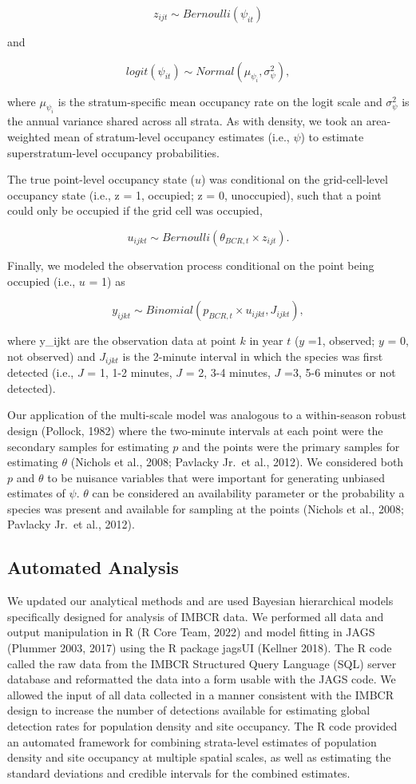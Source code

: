 \documentclass[
  letterpaper,
  DIV=11,
  numbers=noendperiod,
  oneside]{scrreprt}
\begin{document}
\[z_{ijt}\sim Bernoulli(ψ_{it})\]

and

\[logit(ψ_{it} )\sim Normal(μ_{ψ_i},σ_{ψ}^{2}),\]

where \(μ_{ψ_i}\) is the stratum-specific mean occupancy rate on the
logit scale and \(σ_{ψ}^{2}\) is the annual variance shared across all
strata. As with density, we took an area-weighted mean of stratum-level
occupancy estimates (i.e., \(ψ\)) to estimate superstratum-level
occupancy probabilities.

The true point-level occupancy state (\(u\)) was conditional on the
grid-cell-level occupancy state (i.e., z = 1, occupied; z = 0,
unoccupied), such that a point could only be occupied if the grid cell
was occupied,

\[u_{ijkt}\sim Bernoulli(θ_{BCR,t}×z_{ijt}).\]

Finally, we modeled the observation process conditional on the point
being occupied (i.e., \(u\) = 1) as

\[y_{ijkt}\sim Binomial(p_{BCR,t}×u_{ijkt},J_{ijkt}),\]

where y\_ijkt are the observation data at point \(k\) in year \(t\)
(\(y\) =1, observed; \(y\) = 0, not observed) and \(J_{ijkt}\) is the
2-minute interval in which the species was first detected (i.e., \(J\) =
1, 1-2 minutes, \(J\) = 2, 3-4 minutes, \(J\) =3, 5-6 minutes or not
detected).

Our application of the multi-scale model was analogous to a
within-season robust design (Pollock, 1982) where the two-minute
intervals at each point were the secondary samples for estimating \(p\)
and the points were the primary samples for estimating \(θ\) (Nichols et
al., 2008; Pavlacky Jr.~et al., 2012). We considered both \(p\) and
\(θ\) to be nuisance variables that were important for generating
unbiased estimates of \(ψ\). \(θ\) can be considered an availability
parameter or the probability a species was present and available for
sampling at the points (Nichols et al., 2008; Pavlacky Jr.~et al.,
2012).

\hypertarget{automated-analysis-1}{%
\subsection{Automated Analysis}\label{automated-analysis-1}}

We updated our analytical methods and are used Bayesian hierarchical
models specifically designed for analysis of IMBCR data. We performed
all data and output manipulation in R (R Core Team, 2022) and model
fitting in JAGS (Plummer 2003, 2017) using the R package jagsUI (Kellner
2018). The R code called the raw data from the IMBCR Structured Query
Language (SQL) server database and reformatted the data into a form
usable with the JAGS code. We allowed the input of all data collected in
a manner consistent with the IMBCR design to increase the number of
detections available for estimating global detection rates for
population density and site occupancy. The R code provided an automated
framework for combining strata-level estimates of population density and
site occupancy at multiple spatial scales, as well as estimating the
standard deviations and credible intervals for the combined estimates.
\end{document}
